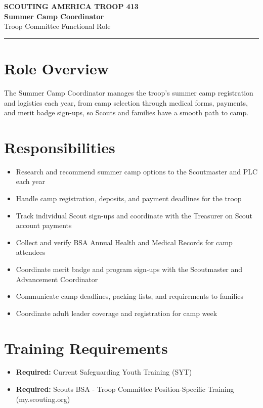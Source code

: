 \documentclass[11pt, letterpaper]{article}
\begin{document}
\begin{center}
  {\small\color{scoutgreen}\textbf{SCOUTING AMERICA \textbullet{} TROOP 413}} \\[4pt]
  {\fontsize{20pt}{24pt}\selectfont\bfseries\color{scoutgreen} Summer Camp Coordinator} \\[4pt]
  {\large\color{accent} Troop Committee \textbullet{} Functional Role} \\[4pt]
  \textcolor{accent}{\rule{0.6\linewidth}{1pt}}
\end{center}

\vspace{0.3em}

\begin{minipage}[t]{0.48\linewidth}
\raggedright

\section{Role Overview}
The Summer Camp Coordinator manages the troop's summer camp registration and logistics each year, from camp selection through medical forms, payments, and merit badge sign-ups, so Scouts and families have a smooth path to camp.

\vspace{0.4em}
\section{Responsibilities}
\begin{itemize}
  \item Research and recommend summer camp options to the Scoutmaster and PLC each year
  \item Handle camp registration, deposits, and payment deadlines for the troop
  \item Track individual Scout sign-ups and coordinate with the Treasurer on Scout account payments
  \item Collect and verify BSA Annual Health and Medical Records for camp attendees
  \item Coordinate merit badge and program sign-ups with the Scoutmaster and Advancement Coordinator
  \item Communicate camp deadlines, packing lists, and requirements to families
  \item Coordinate adult leader coverage and registration for camp week
\end{itemize}

\section{Training Requirements}
\begin{itemize}
  \item \textbf{Required:} Current Safeguarding Youth Training (SYT)
  \item \textbf{Required:} Scouts BSA - Troop Committee Position-Specific Training (my.scouting.org)
\end{itemize}

\end{minipage}
\end{document}
